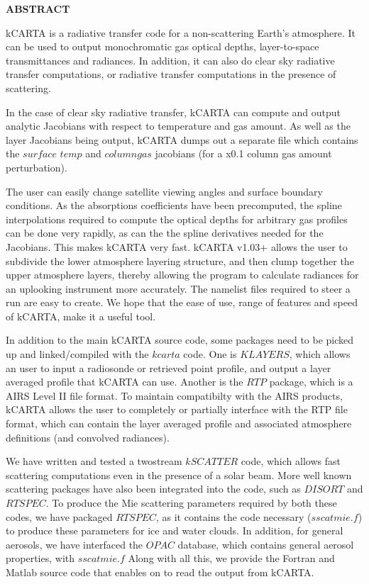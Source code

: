 \documentclass[12pt]{article}
\newcommand{\kc}{\textsf{kCARTA}\xspace}
\begin{document}
\begin{center}
{\bf ABSTRACT}
\end{center}
\kc is a radiative transfer code for a non-scattering Earth's
atmosphere.  It can be used to output monochromatic gas optical
depths, layer-to-space transmittances and radiances.  In addition, it can also 
do clear sky radiative transfer computations, or radiative transfer 
computations in the presence of scattering.

In the case of clear sky radiative transfer, \kc can compute and output 
analytic Jacobians with respect to temperature and gas amount.  As well
as the layer Jacobians being output, \kc dumps out a separate file which
contains the $surface$ $temp$ and $column gas$ jacobians (for a x0.1 
column gas amount perturbation).

The user can easily change satellite viewing angles
and surface boundary conditions.  As the absorptions coefficients have
been precomputed, the spline interpolations required to compute the
optical depths for arbitrary gas profiles can be done very rapidly, as
can the the spline derivatives needed for the Jacobians.  This makes
\kc very fast.  \kc v1.03+ allows the user to subdivide the lower atmosphere 
layering structure, and then clump together the upper atmosphere layers, 
thereby allowing the program to calculate radiances
for an uplooking instrument more accurately. The namelist files required to 
steer a run are easy to create.  We hope that the ease of use, range of 
features and speed of \kc, make it a useful tool.

In addition to the main \kc source code, some packages need to be picked up
and linked/compiled with the $kcarta$ code. One is $KLAYERS$, which allows an 
user to input a radiosonde or retrieved point profile, and output a layer 
averaged profile that \kc can use. Another is the $RTP$ package, which is a 
AIRS Level II file format. To maintain compatibilty with the AIRS products, 
\kc allows the user to completely or partially interface with the RTP file 
format, which can contain the layer averaged profile and associated 
atmosphere definitions (and convolved radiances). 

We have written and tested a twostream $kSCATTER$ code, which allows fast 
scattering
computations even in the presence of a solar beam. More well known scattering
packages have also been integrated into the code, such as $DISORT$ and 
$RTSPEC$. To produce the Mie scattering parameters required
by both these codes, we have packaged $RTSPEC$, as it contains the code 
necessary ($sscatmie.f$) to produce these parameters for ice and water clouds. 
In addition, for general aerosols, we have interfaced the $OPAC$ database, 
which contains general aerosol properties, with $sscatmie.f$ Along with all 
this, we provide the Fortran and Matlab source code that enables on to read
the output from \kc.
\end{document}
